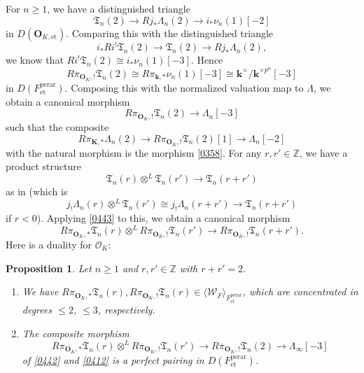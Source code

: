 \documentclass{amsart}
\newtheorem{Prop}[Thm]{Proposition}
\theoremstyle{remark}
\numberwithin{equation}{subsection}
\newcommand{\Order}{\mathcal{O}}
\newcommand{\tensor}{\mathbin{\otimes}}
\newcommand{\Z}{\mathbb{Z}}
\newcommand{\et}{\mathrm{et}}
\newcommand{\perar}{\mathrm{perar}}
\newcommand{\alg}[1]{\mathbf{#1}}
\newcommand{\genby}[1]{\langle #1 \rangle}
\begin{document}
For $n \ge 1$, we have a distinguished triangle
	\[
			\mathfrak{T}_{n}(2)
		\to
			R j_{\ast} \Lambda_{n}(2)
		\to
			i_{\ast} \nu_{n}(1)[-2]
	\]
in $D(\alg{O}_{K, \et})$.
Comparing this with the distinguished triangle
	\[
			i_{\ast} R i^{!} \mathfrak{T}_{n}(2)
		\to
			\mathfrak{T}_{n}(2)
		\to
			R j_{\ast} \Lambda_{n}(2),
	\]
we know that $R i^{!} \mathfrak{T}_{n}(2) \cong i_{\ast} \nu_{n}(1)[-3]$.
Hence
	\begin{equation} \label{0499}
			R \pi_{\alg{O}_{K}, !} \mathfrak{T}_{n}(2)
		\cong
			R \pi_{\alg{k}, \ast} \nu_{n}(1)[-3]
		\cong
			\alg{k}^{\times} / \alg{k}^{\times p^{n}}[-3]
	\end{equation}
in $D(F^{\perar}_{\et})$.
Composing this with the normalized valuation map to $\Lambda$, we obtain a canonical morphism
	\begin{equation} \label{0412}
			R \pi_{\alg{O}_{K}, !} \mathfrak{T}_{n}(2)
		\to
			\Lambda_{n}[-3]
	\end{equation}
such that the composite
	\[
			R \pi_{\alg{K}, \ast} \Lambda_{n}(2)
		\to
			R \pi_{\alg{O}_{K}, !} \mathfrak{T}_{n}(2)[1]
		\to
			\Lambda_{n}[-2]
	\]
with the natural morphism is the morphism \eqref{0358}.
For any $r, r' \in \Z$, we have a product structure
	\[
			\mathfrak{T}_{n}(r) \tensor^{L} \mathfrak{T}_{n}(r')
		\to
			\mathfrak{T}_{n}(r + r')
	\]
as in \cite[Proposition 4.2.6]{Sat07}
(which is
	\[
			j_{!} \Lambda_{n}(r) \tensor^{L} \mathfrak{T}_{n}(r')
		\cong
			j_{!} \Lambda_{n}(r + r')
		\to
			\mathfrak{T}_{n}(r + r')
	\]
if $r < 0$).
Applying \eqref{0443} to this, we obtain a canonical morphism
	\begin{equation} \label{0442}
				R \pi_{\alg{O}_{K}, \ast}
				\mathfrak{T}_{n}(r)
			\tensor^{L}
				R \pi_{\alg{O}_{K}, !}
				\mathfrak{T}_{n}(r')
		\to
			R \pi_{\alg{O}_{K}, !}
			\mathfrak{T}_{n}(r + r').
	\end{equation}
Here is a duality for $\Order_{K}$:

\begin{Prop} \label{0445}
	Let $n \ge 1$ and $r, r' \in \Z$ with $r + r' = 2$.
	\begin{enumerate}
		\item
			We have
				$
						R \pi_{\alg{O}_{K}, \ast} \mathfrak{T}_{n}(r),
						R \pi_{\alg{O}_{K}, !} \mathfrak{T}_{n}(r)
					\in
						\genby{\mathcal{W}_{F}}_{F^{\perar}_{\et}}
				$,
			which are concentrated in degrees $\le 2$, $\le 3$, respectively.
		\item
			The composite morphism
				\begin{equation} \label{0446}
							R \pi_{\alg{O}_{K}, \ast} \mathfrak{T}_{n}(r)
						\tensor^{L}
							R \pi_{\alg{O}_{K}, !} \mathfrak{T}_{n}(r')
					\to
						R \pi_{\alg{O}_{K}, !} \mathfrak{T}_{n}(2)
					\to
						\Lambda_{\infty}[-3]
				\end{equation}
			of \eqref{0442} and \eqref{0412} is a perfect pairing in $D(F^{\perar}_{\et})$.
	\end{enumerate}
\end{Prop}
\end{document}
